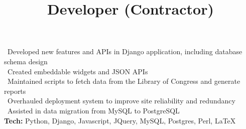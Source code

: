         \title{Developer (Contractor)}
        \begin{position}
			\textbullet \ Developed new features and APIs in Django application, including database schema design \\
			\textbullet \ Created embeddable widgets and JSON APIs \\
			\textbullet \ Maintained scripts to fetch data from the Library of Congress and generate reports \\
			\textbullet \ Overhauled deployment system to improve site reliability and redundancy\\
			\textbullet \ Assisted in data migration from MySQL to PostgreSQL\\
			\textbf{Tech:} Python, Django, Javascript, JQuery, MySQL, Postgres, Perl, \LaTeX
        \end{position}
        


